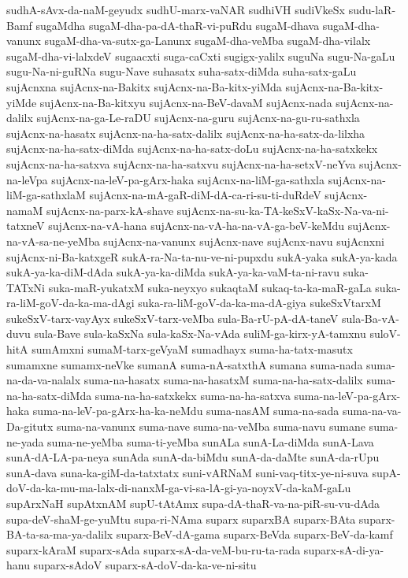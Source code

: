 {sudhA-sAvx-da-naM-geyudx
sudhU-marx-vaNAR
sudhiVH
sudiVkeSx
sudu-laR-Bamf
sugaMdha
sugaM-dha-pa-dA-thaR-vi-puRdu
sugaM-dhava
sugaM-dha-vanunx
sugaM-dha-va-sutx-ga-Lanunx
sugaM-dha-veMba
sugaM-dha-vilalx
sugaM-dha-vi-lalxdeV
sugaacxti
suga-caCxti
sugigx-yalilx
suguNa
sugu-Na-gaLu
sugu-Na-ni-guRNa
sugu-Nave
suhasatx
suha-satx-diMda
suha-satx-gaLu
sujAcnxna
sujAcnx-na-Bakitx
sujAcnx-na-Ba-kitx-yiMda
sujAcnx-na-Ba-kitx-yiMde
sujAcnx-na-Ba-kitxyu
sujAcnx-na-BeV-davaM
sujAcnx-nada
sujAcnx-na-dalilx
sujAcnx-na-ga-Le-raDU
sujAcnx-na-guru
sujAcnx-na-gu-ru-sathxla
sujAcnx-na-hasatx
sujAcnx-na-ha-satx-dalilx
sujAcnx-na-ha-satx-da-lilxha
sujAcnx-na-ha-satx-diMda
sujAcnx-na-ha-satx-doLu
sujAcnx-na-ha-satxkekx
sujAcnx-na-ha-satxva
sujAcnx-na-ha-satxvu
sujAcnx-na-ha-setxV-neYva
sujAcnx-na-leVpa
sujAcnx-na-leV-pa-gArx-haka
sujAcnx-na-liM-ga-sathxla
sujAcnx-na-liM-ga-sathxlaM
sujAcnx-na-mA-gaR-diM-dA-ca-ri-su-ti-duRdeV
sujAcnx-namaM
sujAcnx-na-parx-kA-shave
sujAcnx-na-su-ka-TA-keSxV-kaSx-Na-va-ni-tatxneV
sujAcnx-na-vA-hana
sujAcnx-na-vA-ha-na-vA-ga-beV-keMdu
sujAcnx-na-vA-sa-ne-yeMba
sujAcnx-na-vanunx
sujAcnx-nave
sujAcnx-navu
sujAcnxni
sujAcnx-ni-Ba-katxgeR
sukA-ra-Na-ta-nu-ve-ni-pupxdu
sukA-yaka
sukA-ya-kada
sukA-ya-ka-diM-dAda
sukA-ya-ka-diMda
sukA-ya-ka-vaM-ta-ni-ravu
suka-TATxNi
suka-maR-yukatxM
suka-neyxyo
sukaqtaM
sukaq-ta-ka-maR-gaLa
suka-ra-liM-goV-da-ka-ma-dAgi
suka-ra-liM-goV-da-ka-ma-dA-giya
sukeSxVtarxM
sukeSxV-tarx-vayAyx
sukeSxV-tarx-veMba
sula-Ba-rU-pA-dA-taneV
sula-Ba-vA-duvu
sula-Bave
sula-kaSxNa
sula-kaSx-Na-vAda
suliM-ga-kirx-yA-tamxnu
suloV-hitA
sumAmxni
sumaM-tarx-geVyaM
sumadhayx
suma-ha-tatx-masutx
sumamxne
sumamx-neVke
sumanA
suma-nA-satxthA
sumana
suma-nada
suma-na-da-va-nalalx
suma-na-hasatx
suma-na-hasatxM
suma-na-ha-satx-dalilx
suma-na-ha-satx-diMda
suma-na-ha-satxkekx
suma-na-ha-satxva
suma-na-leV-pa-gArx-haka
suma-na-leV-pa-gArx-ha-ka-neMdu
suma-nasAM
suma-na-sada
suma-na-va-Da-gitutx
suma-na-vanunx
suma-nave
suma-na-veMba
suma-navu
sumane
suma-ne-yada
suma-ne-yeMba
suma-ti-yeMba
sunALa
sunA-La-diMda
sunA-Lava
sunA-dA-LA-pa-neya
sunAda
sunA-da-biMdu
sunA-da-daMte
sunA-da-rUpu
sunA-dava
suna-ka-giM-da-tatxtatx
suni-vARNaM
suni-vaq-titx-ye-ni-suva
supA-doV-da-ka-mu-ma-lalx-di-nanxM-ga-vi-sa-lA-gi-ya-noyxV-da-kaM-gaLu
supArxNaH
supAtxnAM
supU-tAtAmx
supa-dA-thaR-va-na-piR-su-vu-dAda
supa-deV-shaM-ge-yuMtu
supa-ri-NAma
suparx
suparxBA
suparx-BAta
suparx-BA-ta-sa-ma-ya-dalilx
suparx-BeV-dA-gama
suparx-BeVda
suparx-BeV-da-kamf
suparx-kAraM
suparx-sAda
suparx-sA-da-veM-bu-ru-ta-rada
suparx-sA-di-ya-hanu
suparx-sAdoV
suparx-sA-doV-da-ka-ve-ni-situ
}
